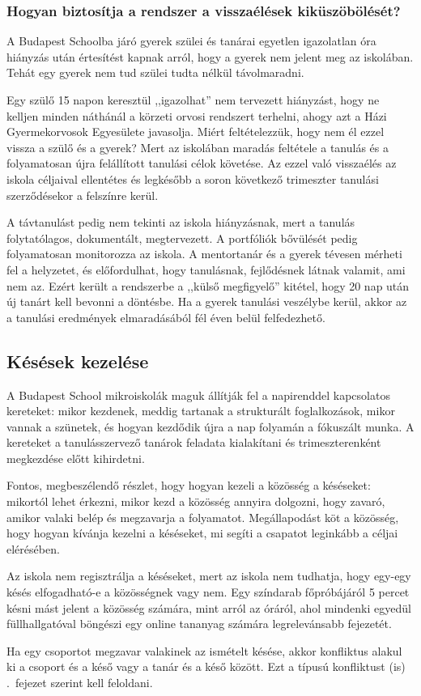 \subsubsection{Hogyan biztosítja a rendszer a visszaélések kiküszöbölését?}
A Budapest Schoolba járó gyerek szülei és tanárai egyetlen igazolatlan óra hiányzás után értesítést kapnak arról, hogy a gyerek nem jelent meg az iskolában. Tehát egy gyerek nem tud szülei tudta nélkül távolmaradni.

Egy szülő 15 napon keresztül ,,igazolhat'' nem tervezett
hiányzást,\linebreak
hogy ne kelljen minden náthánál a körzeti orvosi rendszert terhelni, ahogy azt a Házi Gyermekorvosok Egyesülete javasolja. Miért feltételezzük, hogy nem él ezzel vissza a szülő és a gyerek?  Mert az iskolában maradás feltétele a tanulás és a folyamatosan újra felállított tanulási célok követése. Az ezzel való visszaélés az iskola céljaival ellentétes és legkésőbb a soron következő trimeszter tanulási szerződésekor a felszínre kerül.

A távtanulást pedig nem tekinti az iskola hiányzásnak, mert a tanulás folytatólagos, dokumentált, megtervezett. A portfóliók bővülését pedig folyamatosan monitorozza az iskola. A mentortanár és a gyerek tévesen mérheti fel a helyzetet, és előfordulhat, hogy tanulásnak, fejlődésnek látnak valamit, ami nem az. Ezért került a rendszerbe a ,,külső megfigyelő'' kitétel, hogy 20 nap után új tanárt kell bevonni a döntésbe. Ha a gyerek tanulási veszélybe kerül, akkor az a tanulási eredmények elmaradásából fél éven belül felfedezhető.

\subsection{Késések kezelése}
A Budapest School mikroiskolák maguk állítják fel a napirenddel kapcsolatos kereteket: mikor kezdenek, meddig tartanak a strukturált foglalkozások, mikor vannak a szünetek, és hogyan kezdődik újra a nap folyamán a fóku\-szált munka. A kereteket a tanulásszervező tanárok feladata kialakítani és trimeszterenként megkezdése előtt kihirdetni.

Fontos, megbeszélendő részlet, hogy hogyan kezeli a közösség a késéseket: mikortól lehet érkezni, mikor kezd a közösség annyira dolgozni, hogy zavaró, amikor valaki belép és megzavarja a folyamatot. Megállapodást köt a közösség, hogy hogyan kívánja kezelni a késéseket, mi segíti a csapatot leginkább a céljai elérésében.

Az iskola nem regisztrálja a késéseket, mert az iskola nem tudhatja, hogy egy-egy késés elfogadható-e a közösségnek vagy nem. Egy színdarab főpróbájáról 5 percet késni mást jelent a közösség számára, mint arról az óráról, ahol mindenki egyedül füllhallgatóval böngészi egy online tananyag számára legrelevánsabb fejezetét.

Ha egy csoportot megzavar valakinek az ismételt késése, akkor konfliktus alakul ki a csoport és a késő vagy a tanár és a késő között. Ezt a típusú konfliktust (is) .~fejezet szerint kell feloldani.
